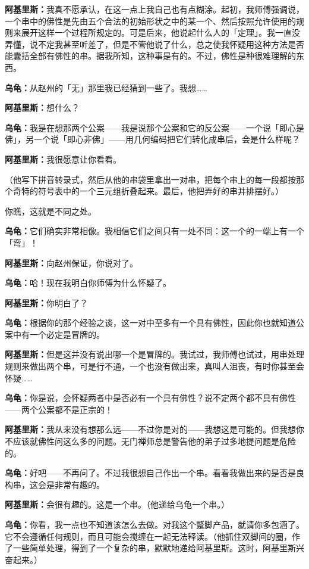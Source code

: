 \documentclass[
  12pt,
  twoside,
  openright,
  oldfontcommands,
]{memoir}
\newcommand{\kaitismall}[1]{{\kaitifamily\small #1}}
\newcommand{\dialogname}[1]{{\heifamily\bfseries #1}}
\begin{document}
\dialogname{阿基里斯：}我真不愿承认，在这一点上我自己也有点糊涂。起初，我师傅强调说，一个串中的佛性是先由五个合法的初始形状之中的某一个、然后按照允许使用的规则来展开这样一个过程所规定的。可是后来，他说起什么人的「定理」。我一直没弄懂，说不定我甚至听差了，但是不管他说了什么，总之使我怀疑用这种方法是否能囊括全部有佛性的串。据我所知，这种事是有的。不过，佛性是种很难理解的东西。

\dialogname{乌龟：}从赵州的「无」那里我已经猜到一些了。我想\ldots\ldots{}

\dialogname{阿基里斯：}想什么？

\dialogname{乌龟：}我是在想那两个公案------我是说那个公案和它的反公案------一个说「即心是佛」，另一个说「即心非佛」------用几何编码把它们转化成串后，会是什么样呢？

\dialogname{阿基里斯：}我很愿意让你看看。

（他写下拼音转录式，然后从他的串袋里拿出一对串，把每个串上的每一段都按那个奇特的符号表中的一个三元组折叠起来。最后，他把弄好的串并排摆好。）

你瞧，这就是不同之处。

\dialogname{乌龟：}它们确实非常相像。我相信它们之间只有一处不同：这一个的一端上有一个「弯」！

\dialogname{阿基里斯：}向赵州保证，你说对了。

\dialogname{乌龟：}哈！现在我明白你师傅为什么怀疑了。

\dialogname{阿基里斯：}你明白了？

\dialogname{乌龟：}根据你的那个经验之谈，这一对中至多有一个具有佛性，因此你也就知道公案中有一个必定是冒牌的。

\dialogname{阿基里斯：}但是这并没有说出哪一个是冒牌的。我试过，我师傅也试过，用串处理规则来做出两个串，可是行不通，一个也没有做出来，真叫人沮丧，有时你甚至会怀疑\ldots\ldots{}

\dialogname{乌龟：}你是说，会怀疑两者中是否必有一个具有佛性？说不定两个都不具有佛性------两个公案都不是正宗的！

\dialogname{阿基里斯：}我从来没有想那么远------不过你是对的------我想这是可能的。但我想你不应该就佛性问这么多的问题。无门禅师总是警告他的弟子过多地提问题是危险的。

\dialogname{乌龟：}好吧------不再问了。不过我很想自己作出一个串。看看我做出来的是否是良构串，这会是非常有趣的。

\dialogname{阿基里斯：}会很有趣的。这是一个串。\kaitismall{（他递给乌龟一个串。）}

\dialogname{乌龟：}你看，我一点也不知道该怎么去做。对我这个蹩脚产品，就请你多包涵了。它不会遵循任何规则，而且可能会搅缠在一起无法释读。\kaitismall{（他抓住双脚间的圈，作了一些简单处理，得到了一个复杂的串，默默地递给阿基里斯。这时，阿基里斯兴奋起来。）}
\end{document}
